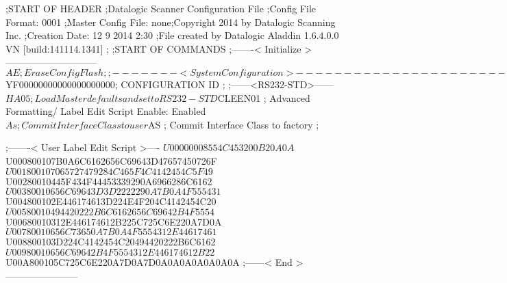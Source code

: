;START OF HEADER
;Datalogic Scanner Configuration File
;Config File Format: 0001
;Master Config File: none;Copyright 2014 by Datalogic Scanning Inc.
;Creation Date: 12 9 2014 2:30
;File created by Datalogic Aladdin 1.6.4.0.0 VN [build:141114.1341]
;
;START OF COMMANDS
;-------< Initialize >-----------------------------
$AE                 ; Erase Config Flash
;
;-------< System Configuration >-------------------------------
$YF00000000000000000000; CONFIGURATION ID
;
;------<RS232-STD>------
$HA05               ; Load Master defaults and set to RS232-STD
$CLEEN01            ; Advanced Formatting/ Label Edit Script Enable: Enabled
$As                 ; Commit Interface Class to user
$AS                 ; Commit Interface Class to factory
;

;-------< User Label Edit Script >----
$U00000008554C453200B20A0A
$U000800107B0A6C6162656C69643D47657450726F
$U001800107065727479284C465F4C4142454C5F49
$U00280010445F434F44453339290A6966286C6162
$U00380010656C69643D3D2222290A7B0A4F555431
$U004800102E446174613D224E4F204C4142454C20
$U00580010494420222B6C6162656C69642B4F5554
$U00680010312E446174612B225C725C6E220A7D0A
$U00780010656C73650A7B0A4F5554312E44617461
$U008800103D224C4142454C20494420222B6C6162
$U00980010656C69642B4F5554312E446174612B22
$U00A800105C725C6E220A7D0A7D0A0A0A0A0A0A0A
;------< End >-----------------------
